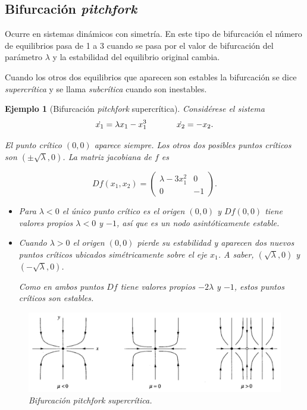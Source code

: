 \documentclass[11pt]{book}
\theoremstyle{definition}
\numberwithin{definition}{section}
\theoremstyle{theorem}
\numberwithin{theorem}{section}
\numberwithin{lemma}{section}
\numberwithin{corollary}{section}
\theoremstyle{plain}
\newtheorem{example}{Ejemplo}
\numberwithin{example}{section}
\begin{document}
\subsection{Bifurcación \textit{pitchfork}}

Ocurre en sistemas dinámicos con simetría. En este tipo de bifurcación el número de equilibrios pasa de 1 a 3 cuando se pasa por el valor de bifurcación del parámetro $\lambda$ y la estabilidad del equilibrio original cambia.

Cuando los otros dos equilibrios que aparecen son estables la bifurcación se dice \emph{supercrítica} y se llama \emph{subcrítica} cuando son inestables.

\begin{example}[Bifurcación \textit{pitchfork} supercrítica]
Considérese el sistema
$$ 
	\dot{x_1} = \lambda x_1 - x_1^3 \hspace{0.5in} \dot{x_2} = -x_2.
$$

El punto crítico $(0,0)$ aparece siempre. Los otros dos posibles puntos críticos son $(\pm \sqrt{\lambda}, 0)$.
La matriz jacobiana de $f$ es

$$
	Df(x_1,x_2) = \left( \begin{array}{ll}
		\lambda - 3x_1^2 & 0 \\
		0 & -1
	\end{array} \right).
$$

\begin{itemize}
	\item Para $\lambda < 0$ el único punto crítico es el origen $(0,0)$ y $Df(0,0)$ tiene valores propios $\lambda < 0$ y $-1$, así que es un nodo asintóticamente estable.
	\item Cuando $\lambda > 0$ el origen $(0,0)$ pierde su estabilidad y aparecen dos nuevos puntos críticos ubicados simétricamente sobre el eje $x_1$. A saber, $(\sqrt{\lambda}, 0)$ y $(-\sqrt{\lambda}, 0)$. 

Como en ambos puntos $Df$ tiene valores propios $-2\lambda$ y $-1$, estos puntos críticos son estables.
\end{itemize}

\begin{figure}[ht] \centering
    \includegraphics[scale=0.8]{figures/bifurcations-pitchforksupercritical.png} 
    \caption{Bifurcación \textit{pitchfork} supercrítica.}
\end{figure}

\end{example}
\end{document}
